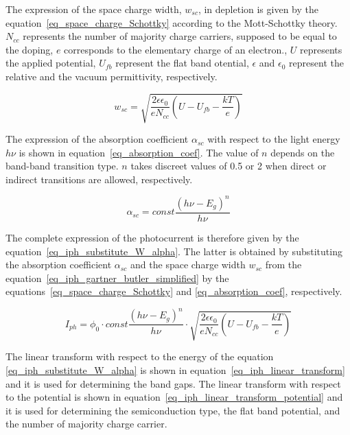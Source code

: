     The expression of the space charge width, $w_{sc}$, in depletion is given 
    by the equation~\ref{eq_space_charge_Schottky} according to the Mott-Schottky theory. 
    $N_{cc}$ represents the number of majority charge carriers, supposed to be 
    equal to the doping, $e$ corresponds to the elementary charge of an electron., 
    $U$ represents the applied potential, $U_{fb}$ represent the flat band 
    otential, $\epsilon$ and $\epsilon _0$ represent the relative and the 
    vacuum permittivity, respectively.   

    \begin{equation}
        w_{sc} = \sqrt{ \frac{2\epsilon \epsilon _0}{e N_{cc}} (U-U_{fb}-\frac{kT}{e}) }
        \label{eq_space_charge_Schottky}
    \end{equation}

    The expression of the absorption coefficient $\alpha _{sc}$ with respect to 
    the light energy $h\nu$ is shown in equation~\ref{eq_absorption_coef}. 
    The value of $n$ depends on the band-band transition type. $n$ takes discreet 
    values of 0.5 or 2 when direct or indirect transitions are allowed, respectively.
      

    \begin{equation}
        \alpha _{sc} = const \frac{(h\nu - E_g)^n}{h\nu}
        \label{eq_absorption_coef}
    \end{equation}

    The complete expression of the photocurrent is therefore given by the 
    equation~\ref{eq_iph_substitute_W_alpha}. 
    The latter is obtained by substituting the absorption coefficient $\alpha _{sc}$ 
    and the space charge width $w_{sc}$ from the 
    equation~\ref{eq_iph_gartner_butler_simplified}
    by the equations~\ref{eq_space_charge_Schottky} and \ref{eq_absorption_coef}, 
    respectively. 

    \begin{equation}
        I_{ph} = \phi _0 \cdot const \frac{(h\nu - E_g)^n}{h\nu}
            \cdot \sqrt{ \frac{2\epsilon \epsilon _0}{e N_{cc}} (U-U_{fb}-\frac{kT}{e}) }
        \label{eq_iph_substitute_W_alpha}
    \end{equation}
    
    The linear transform with respect to the energy of the 
    equation \ref{eq_iph_substitute_W_alpha} is shown in 
    equation~\ref{eq_iph_linear_transform} and it is used for determining 
    the band gaps. 
    The linear transform with respect to the potential is shown in 
    equation~\ref{eq_iph_linear_transform_potential} and it is used for determining 
    the semiconduction type, the flat band potential, 
    and the number of majority charge carrier.


